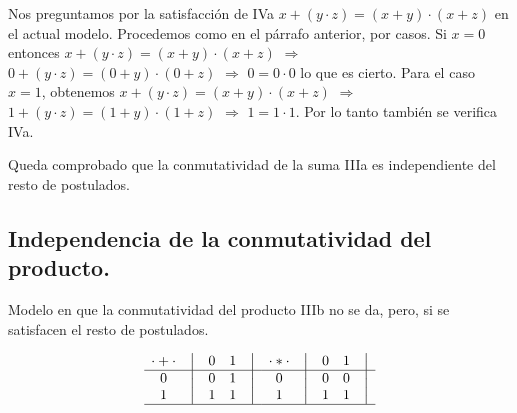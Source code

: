 \documentclass[12pt,a4paper]{article}
\begin{document}
	Nos preguntamos por la satisfacción de IVa \( x + ( y \cdot z
) = ( x + y ) \cdot ( x + z ) \) en el actual modelo. Procedemos como en el
párrafo anterior, por casos. Si \(x = 0\) entonces \( x + ( y \cdot z ) = ( x
+ y ) \cdot ( x + z ) \) \(\Longrightarrow\) \(0 + ( y \cdot z ) = ( 0 + y )
\cdot ( 0 + z )\) \(\Longrightarrow\) \( 0 = 0 \cdot 0\) lo que es cierto.
Para el caso \(x = 1\),  obtenemos \( x + ( y \cdot z ) = ( x + y ) \cdot ( x
+ z ) \) \(\Longrightarrow\) \( 1 + ( y \cdot z ) = ( 1 + y ) \cdot ( 1 + z
)\) \(\Longrightarrow\) \( 1 = 1 \cdot 1 \). Por lo tanto también se verifica
IVa.



	Queda comprobado que la conmutatividad de la suma IIIa es independiente del resto de postulados.



\subsection{Independencia de la conmutatividad del producto.}



	Modelo en que la conmutatividad del producto IIIb no se da,
pero, si se satisfacen el resto de postulados.



\begin{equation}
    \begin{matrix}
        {\cdot + \cdot} & \big{\vert} & {0} & {1} & \big{\vert} \\
        \hline
        {0}             & \big{\vert} & {0} & {1} & \big{\vert} \\
        {1}             & \big{\vert} & {1} & {1} & \big{\vert} \\
        \hline
    \end{matrix}
    \quad
    \begin{matrix}
        {\cdot * \cdot} & \big{\vert} & {0} & {1} & \big{\vert} \\
        \hline
        {0}                   & \big{\vert} & {0} & {0} & \big{\vert} \\
        {1}                   & \big{\vert} & {1} & {1} & \big{\vert} \\
        \hline
    \end{matrix}
\end{equation}
\end{document}
